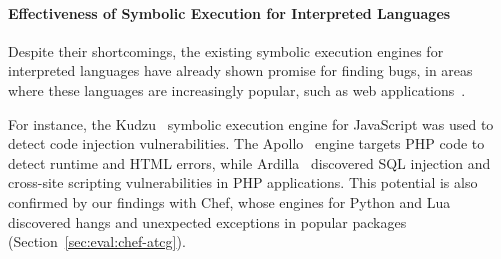 \paragraph{Effectiveness of Symbolic Execution for Interpreted Languages}

Despite their shortcomings, the existing symbolic execution engines for interpreted languages have already shown promise for finding bugs, in areas where these languages are increasingly popular, such as web applications~\cite{saxena-kudzu,artzi-apollo, kiezun-ardilla}.

For instance, the Kudzu~\cite{saxena-kudzu} symbolic execution engine for JavaScript was used to detect code injection vulnerabilities.  The Apollo~\cite{artzi-apollo} engine targets PHP code to detect runtime and HTML errors, while Ardilla~\cite{kiezun-ardilla} discovered SQL injection and cross-site scripting vulnerabilities in PHP applications.
%
This potential is also confirmed by our findings with Chef, whose engines for Python and Lua discovered hangs and unexpected exceptions in popular packages (Section~\ref{sec:eval:chef-atcg}).

